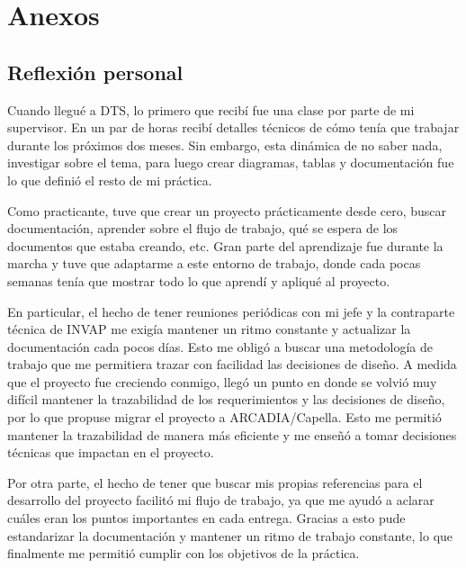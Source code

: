\leftskip 0in
\parindent 1.27cm %
\newpage
\section{Anexos}

\subsection{Reflexión personal}

Cuando llegué a DTS, lo primero que recibí fue una clase por parte de mi supervisor. En un par de horas recibí detalles técnicos de cómo tenía que trabajar durante los próximos dos meses. Sin embargo, esta dinámica de no saber nada, investigar sobre el tema, para luego crear diagramas, tablas y documentación fue lo que definió el resto de mi práctica.

Como practicante, tuve que crear un proyecto prácticamente desde cero, buscar documentación, aprender sobre el flujo de trabajo, qué se espera de los documentos que estaba creando, etc. Gran parte del aprendizaje fue durante la marcha y tuve que adaptarme a este entorno de trabajo, donde cada pocas semanas tenía que mostrar todo lo que aprendí y apliqué al proyecto.

En particular, el hecho de tener reuniones periódicas con mi jefe y la contraparte técnica de INVAP me exigía mantener un ritmo constante y actualizar la documentación cada pocos días. Esto me obligó a buscar una metodología de trabajo que me permitiera trazar con facilidad las decisiones de diseño. A medida que el proyecto fue creciendo conmigo, llegó un punto en donde se volvió muy difícil mantener la trazabilidad de los requerimientos y las decisiones de diseño, por lo que propuse migrar el proyecto a ARCADIA/Capella. Esto me permitió mantener la trazabilidad de manera más eficiente y me enseñó a tomar decisiones técnicas que impactan en el proyecto.

Por otra parte, el hecho de tener que buscar mis propias referencias para el desarrollo del proyecto facilitó mi flujo de trabajo, ya que me ayudó a aclarar cuáles eran los puntos importantes en cada entrega. Gracias a esto pude estandarizar la documentación y mantener un ritmo de trabajo constante, lo que finalmente me permitió cumplir con los objetivos de la práctica.

